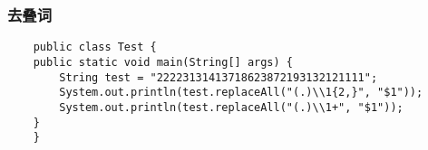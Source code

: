 \documentclass[a4paper]{article}
\begin{document}
	\subsubsection{去叠词}
	
	\begin{lstlisting}
	public class Test {
	public static void main(String[] args) {
		String test = "22223131413718623872193132121111";
		System.out.println(test.replaceAll("(.)\\1{2,}", "$1"));
		System.out.println(test.replaceAll("(.)\\1+", "$1"));
	}
	}
	\end{lstlisting}
\end{document}
